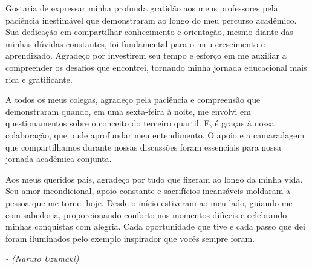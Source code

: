 \documentclass[
	12pt,			%
	openany,		%
	oneside,		%
	a4paper,		%
	english,		%
	brazil			%
	]{abntex2}
\begin{document}
\begin{agradecimentos}
  
	Gostaria de expressar minha profunda gratidão aos meus professores pela paciência inestimável que demonstraram ao longo do meu percurso acadêmico. Sua dedicação em compartilhar conhecimento e orientação, mesmo diante das minhas dúvidas constantes, foi fundamental para o meu crescimento e aprendizado. Agradeço por investirem seu tempo e esforço em me auxiliar a compreender os desafios que encontrei, tornando minha jornada educacional mais rica e gratificante.\par
	A todos os meus colegas, agradeço pela paciência e compreensão que demonstraram quando, em uma sexta-feira à noite, me envolvi em questionamentos sobre o conceito do terceiro quartil. E, é graças à nossa colaboração, que pude aprofundar meu entendimento. O apoio e a camaradagem que compartilhamos durante nossas discussões foram essenciais para nossa jornada acadêmica conjunta. \par	
	Aos meus queridos pais, agradeço por tudo que fizeram ao longo da minha vida. Seu amor incondicional, apoio constante e sacrifícios incansáveis moldaram a pessoa que me tornei hoje. Desde o início estiveram ao meu lado, guiando-me com sabedoria, proporcionando conforto nos momentos difíceis e celebrando minhas conquistas com alegria. Cada oportunidade que tive e cada passo que dei foram iluminados pelo exemplo inspirador que vocês sempre foram.

\end{agradecimentos}

\begin{epigrafe}
   \vspace*{\fill}
   \begin{flushright}
	\textit{ - (Naruto Uzumaki)}
   \end{flushright}
\end{epigrafe}

\setlength{\absparsep}{18pt} %
\end{document}
